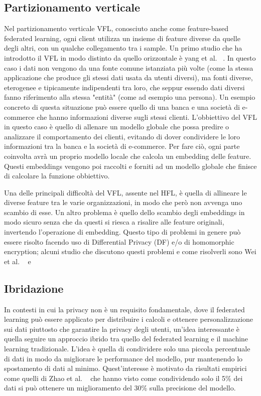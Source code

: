 \subsection{Partizionamento verticale}
Nel partizionamento verticale VFL, conosciuto anche come feature-based 
federated learning, ogni client utilizza un insieme 
di feature diverse da quelle degli altri, con un qualche collegamento 
tra i sample. Un primo studio che ha introdotto il VFL in modo distinto
da quello orizzontale è yang et al. ~\cite{yang2019vfl}.
In questo caso i dati non vengono da una 
fonte comune istanziata più volte (come la stessa applicazione che 
produce gli stessi dati usata da utenti diversi), ma fonti diverse,
eterogenee e tipicamente indipendenti tra loro, che seppur essendo
dati diversi fanno riferimento alla stessa "entità" (come ad esempio
una persona). Un esempio concreto di questa situazione può essere 
quello di una banca e una società di e-commerce che hanno informazioni
diverse sugli stessi clienti. L'obbiettivo del VFL in questo caso è
quello di allenare un modello globale che possa predire o analizzare
il comportamento dei clienti, evitando di dover condividere le loro 
informazioni tra la banca e la società di e-commerce.
Per fare ciò, ogni parte coinvolta avrà un proprio modello locale che 
calcola un embedding delle feature. Questi embeddings vengono poi
raccolti e forniti ad un modello globale che finisce di calcolare la 
funzione obbiettivo.

Una delle principali difficoltà del VFL, assente nel HFL, è quella 
di allineare le diverse feature tra le varie organizzazioni, in 
modo che però non avvenga uno scambio di esse. Un altro problema è 
quello dello scambio degli embeddings in modo sicuro senza che da 
questi si riesca a risalire alle feature originali, invertendo
l'operazione di embedding. Questo tipo di problemi in genere può 
essere risolto facendo uso di Differential Privacy (DF) e/o di 
homomorphic encryption; alcuni studio che discutono questi problemi e
come risolverli sono Wei et al. ~\cite{wei2022vflChallenge} e 
~\cite{liu2022vflChallenge}


\subsection{Ibridazione}
In contesti in cui la privacy non è un requisito fondamentale, dove il
federated learning può essere applicato per distribuire i calcoli e 
ottenere personalizzazione sui dati piuttosto che garantire la privacy
degli utenti, un'idea interessante è quella seguire un approccio ibrido 
tra quello del federated learning e il machine learning tradizionale.
L'idea è quella di condividere solo una piccola percentuale di dati 
in modo da migliorare le performance del modello, pur mantenendo lo 
spostamento di dati al minimo. Quest'interesse è motivato da risultati 
empirici come quelli di Zhao et al. ~\cite{zhao2018flniid} che hanno 
visto come condividendo solo il 5\% dei dati si può ottenere un 
miglioramento del 30\% sulla precisione del modello.

